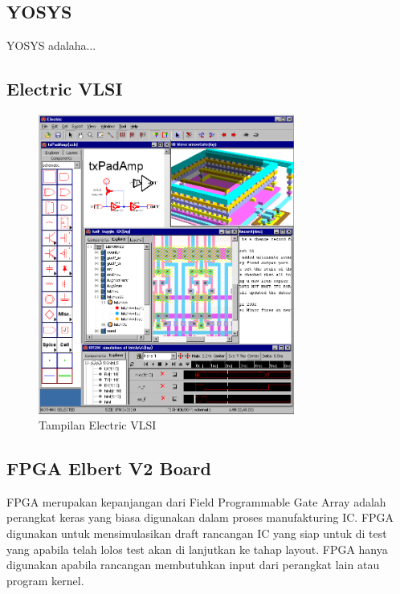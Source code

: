 \subsection{YOSYS}
YOSYS adalaha...

\subsection{Electric VLSI}

\begin{figure}
	\centering
	\includegraphics[width=0.75\textwidth]
	{pics/electricvlsi.png}
	\caption{Tampilan Electric VLSI}
	\label{fig:vlsi}
\end{figure}

\subsection{FPGA Elbert V2 Board}
FPGA merupakan kepanjangan dari Field Programmable Gate Array adalah perangkat keras yang biasa digunakan dalam proses manufakturing IC. FPGA digunakan untuk mensimulasikan draft rancangan IC yang siap untuk di test yang apabila telah lolos test akan di lanjutkan ke tahap layout. FPGA hanya digunakan apabila rancangan membutuhkan input dari perangkat lain atau program kernel.

